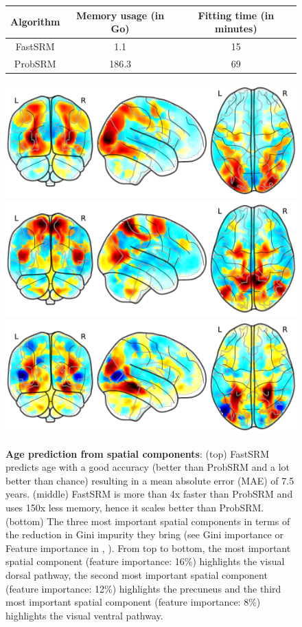 \documentclass{report}
\begin{document}
{\begin{figure}
\begin{tabular}{|c|c|c|}
	\hline
	Algorithm & Memory usage (in Go) & Fitting time (in minutes) \\
	\hline
	FastSRM & 1.1 & 15 \\
	ProbSRM & 186.3 & 69 \\
	\hline
\end{tabular}
\includegraphics[scale=0.365]{./figures/srm/maps_feature_imp_0_16.pdf}
\includegraphics[scale=0.365]{./figures/srm/maps_feature_imp_0_12.pdf}
\includegraphics[scale=0.365]{./figures/srm/maps_feature_imp_0_08.pdf}

\caption{\textbf{Age prediction from spatial components}: (top) FastSRM predicts age with a good accuracy (better than ProbSRM and a lot better than chance) resulting in a mean absolute error (MAE) of 7.5 years. (middle) FastSRM is more than 4x faster than ProbSRM and uses 150x less memory, hence it scales better than ProbSRM. (bottom) The three most important spatial components in terms of the reduction in Gini impurity they bring (see Gini importance or Feature importance in \cite{breiman2001random}, \cite{louppe2013understanding}). From top to bottom, the most important spatial component (feature importance: 16\%) highlights the visual dorsal pathway, the second most important spatial component (feature importance: 12\%) highlights the precuneus and the third most important spatial component (feature importance: 8\%) highlights the visual ventral pathway.} 
\label{fig:predict_age}
\end{figure}

}
\end{document}
